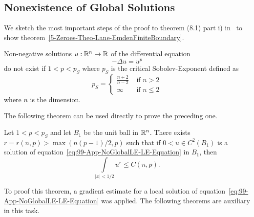 \subsection{Nonexistence of Global \texorpdfstring{}{LE} Solutions}
\label{subsec:99-App-NoGlobalLE}
We sketch the most important steps of the proof to theorem (8.1) part i) in~\cite[p.~36]{quittnerSuperlinearParabolicProblems2007} to show theorem~\ref{5-Zeroes-Theo-Lane-EmdenFiniteBoundary}.
\begin{lemma}
	\label{lem:99-App-NoGlobalLE-Lemm8-1}
	Non-negative solutions $u:\mathbb{R}^n\rightarrow\mathbb{R}$ of the differential equation
	\begin{equation}
		-\Delta u=u^p
		\label{eq:99-App-NoGlobalLE-LE-Equation}
	\end{equation}
	do not exist if $1<p<p_S$ where $p_S$ is the critical Sobolev-Exponent defined as
	\begin{equation}
		p_S=\begin{cases}
				\frac{n+2}{n-2} &\text{ if } n>2\\
				\infty &\text{ if } n\leq2
			\end{cases}
		\label{eq:99-App-NoGlobalLE-LE-Sobolev-Exponent}
	\end{equation}
	where $n$ is the dimension.
\end{lemma}
The following theorem can be used directly to prove the preceding one.
\begin{lemma}
	\label{lem:99-App-NoGlobalLE-Lemm8-6}
	Let $1<p<p_S$ and let $B_1$ be the unit ball in $\mathbb{R}^n$.
	There exists $r=r(n,p)>\max{(n(p-1)/2,p)}$ such that if $0<u\in C^2(B_1)$ is a solution of equation~\eqref{eq:99-App-NoGlobalLE-LE-Equation} in $B_1$, then
	\begin{equation}
		\int\limits_{|x|<1/2}u^r\leq C(n,p).
		\label{eq:99-App-NoGlobalLE-LE-Inequality}
	\end{equation}
\end{lemma}
To proof this theorem, a gradient estimate for a local solution of equation~\eqref{eq:99-App-NoGlobalLE-LE-Equation} was applied.
The following theorems are auxiliary in this task.
